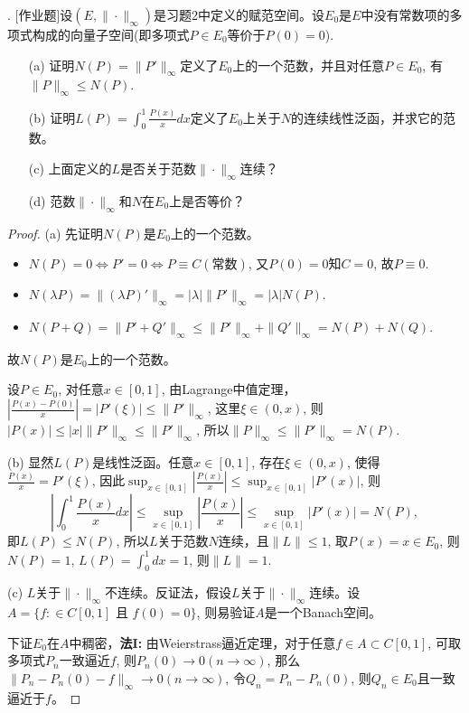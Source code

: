 \documentclass[a4paper,8pt]{ctexart}\textwidth 140mm \textheight 216mm
\newcommand{\8}{\infty}
\begin{document}

. [作业题]设$(E,\|\cdot\|_\infty)$是习题2中定义的赋范空间。设$E_0$是$E$中没有常数项的多项式构成的向量子空间(即多项式$P\in E_0$等价于$P(0)=0$).
\begin{enumerate}
	\item[(a)] 证明$N(P)=\|P'\|_\infty$定义了$E_0$上的一个范数，并且对任意$P\in E_0$, 有$\|P\|_\infty\leq N(P)$.
	\item[(b)] 证明$L(P)=\int_0^1 \frac{P(x)}{x}dx$定义了$E_0$上关于$N$的连续线性泛函，并求它的范数。
	\item[(c)] 上面定义的$L$是否关于范数$\|\cdot\|_\infty$连续？
	\item[(d)] 范数$\|\cdot\|_\infty$和$N$在$E_0$上是否等价？
\end{enumerate}
\begin{proof}
	(a) 先证明$N(P)$是$E_0$上的一个范数。
	\begin{itemize}
		\item $N(P)=0\Leftrightarrow P'=0\Leftrightarrow P\equiv C(\mbox{常数})$, 又$P(0)=0$知$C=0$, 故$P\equiv 0$.
		\item $N(\lambda P)=\|(\lambda P)'\|_\infty=|\lambda|\|P'\|_\infty=|\lambda|N(P)$.
		\item $N(P+Q)=\|P'+Q'\|_\infty\leq \|P'\|_\infty+\|Q'\|_\infty=N(P)+N(Q)$.
	\end{itemize}
	故$N(P)$是$E_0$上的一个范数。
	
	设$P\in E_0$, 对任意$x\in[0,1]$, 由Lagrange中值定理，$|\frac{P(x)-P(0)}{x}|=|P'(\xi)|\leq\|P'\|_\infty$, 这里$\xi\in(0,x)$, 则$|P(x)|\leq |x|\|P'\|_\infty\leq \|P'\|_\infty$, 所以$\|P\|_\infty\leq \|P'\|_\infty=N(P)$. 
	
	(b) 显然$L(P)$是线性泛函。任意$x\in[0,1]$, 存在$\xi\in(0,x)$, 使得$\frac{P(x)}{x}=P'(\xi)$, 因此$\sup_{x\in[0,1]}|\frac{P(x)}{x}|\leq \sup_{x\in[0,1]}|P'(x)|$, 则
	$$\left|\int_0^1 \frac{P(x)}{x}dx\right|\leq \sup_{x\in[0,1]}\left|\frac{P(x)}{x}\right|\leq\sup_{x\in[0,1]}|P'(x)|=N(P),$$
	即$L(P)\leq N(P)$, 所以$L$关于范数$N$连续，且$\|L\|\leq 1$, 取$P(x)=x\in E_0$, 则$N(P)=1$, $L(P)=\int_0^1 dx=1$, 则$\|L\|=1$.
	
	(c) $L$关于$\|\cdot\|_\infty$不连续。反证法，假设$L$关于$\|\cdot\|_\infty$连续。设$A=\{f:\in C[0,1]\mbox{ 且 }f(0)=0\}$, 则易验证$A$是一个Banach空间。
	
	下证$E_0$在$A$中稠密，\textbf{法I:} 由Weierstrass逼近定理，对于任意$f\in A\subset C[0,1]$, 可取多项式$P_n$一致逼近$f$, 则$P_n(0)\to 0(n\to\infty)$, 那么$\|P_n-P_n(0)-f\|_{\infty}\to 0(n\to\infty)$, 令$Q_n=P_n-P_n(0)$, 则$Q_n\in E_0$且一致逼近于$f$。
	

\end{proof}
\end{document}

